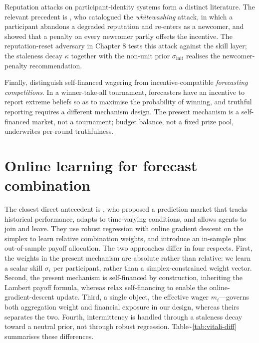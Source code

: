 \documentclass[
  11pt,
  a4paper,
  oneside]{report}
\begin{document}
Reputation attacks on participant-identity systems form a distinct
literature. The relevant precedent is \citet{feldman2004freeriding}, who
catalogued the \emph{whitewashing} attack, in which a participant
abandons a degraded reputation and re-enters as a newcomer, and showed
that a penalty on every newcomer partly offsets the incentive. The
reputation-reset adversary in Chapter 8 tests this attack against the
skill layer; the staleness decay \(\kappa\) together with the non-unit
prior \(\sigma_{\mathrm{init}}\) realises the newcomer-penalty
recommendation.

Finally, \citet{witkowski2018forecasting} distinguish self-financed
wagering from incentive-compatible \emph{forecasting competitions}. In a
winner-take-all tournament, forecasters have an incentive to report
extreme beliefs so as to maximise the probability of winning, and
truthful reporting requires a different mechanism design. The present
mechanism is a self-financed market, not a tournament; budget balance,
not a fixed prize pool, underwrites per-round truthfulness.

\section{Online learning for forecast
combination}\label{online-learning-for-forecast-combination}

The closest direct antecedent is \citet{vitali2025intermittent}, who
proposed a prediction market that tracks historical performance, adapts
to time-varying conditions, and allows agents to join and leave. They
use robust regression with online gradient descent on the simplex to
learn relative combination weights, and introduce an in-sample plus
out-of-sample payoff allocation. The two approaches differ in four
respects. First, the weights in the present mechanism are absolute
rather than relative: we learn a scalar skill \(\sigma_i\) per
participant, rather than a simplex-constrained weight vector. Second,
the present mechanism is self-financed by construction, inheriting the
Lambert payoff formula, whereas \citet{vitali2025intermittent} relax
self-financing to enable the online-gradient-descent update. Third, a
single object, the effective wager \(m_i\)---governs both aggregation
weight and financial exposure in our design, whereas theirs separates
the two. Fourth, intermittency is handled through a staleness decay
toward a neutral prior, not through robust regression.
Table\textasciitilde{}\ref{tab:vitali-diff} summarises these
differences.
\end{document}
